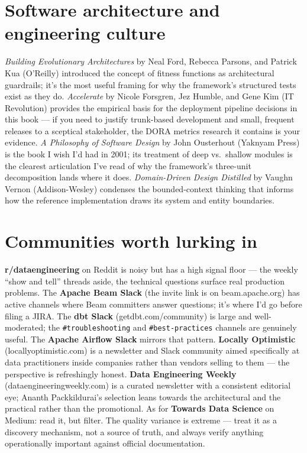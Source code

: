 \documentclass[
  11pt,
  british,
  oneside]{book}
\begin{document}
\hypertarget{software-architecture-and-engineering-culture}{%
\section{Software architecture and engineering
culture}\label{software-architecture-and-engineering-culture}}

\emph{Building Evolutionary Architectures} by Neal Ford, Rebecca
Parsons, and Patrick Kua (O'Reilly) introduced the concept of fitness
functions as architectural guardrails; it's the most useful framing for
why the framework's structured tests exist as they do. \emph{Accelerate}
by Nicole Forsgren, Jez Humble, and Gene Kim (IT Revolution) provides
the empirical basis for the deployment pipeline decisions in this book
--- if you need to justify trunk-based development and small, frequent
releases to a sceptical stakeholder, the DORA metrics research it
contains is your evidence. \emph{A Philosophy of Software Design} by
John Ousterhout (Yaknyam Press) is the book I wish I'd had in 2001; its
treatment of deep vs.~shallow modules is the clearest articulation I've
read of why the framework's three-unit decomposition lands where it
does. \emph{Domain-Driven Design Distilled} by Vaughn Vernon
(Addison-Wesley) condenses the bounded-context thinking that informs how
the reference implementation draws its system and entity boundaries.

\hypertarget{communities-worth-lurking-in}{%
\section{Communities worth lurking
in}\label{communities-worth-lurking-in}}

\textbf{r/dataengineering} on Reddit is noisy but has a high signal
floor --- the weekly ``show and tell'' threads aside, the technical
questions surface real production problems. The \textbf{Apache Beam
Slack} (the invite link is on beam.apache.org) has active channels where
Beam committers answer questions; it's where I'd go before filing a
JIRA. The \textbf{dbt Slack} (getdbt.com/community) is large and
well-moderated; the \texttt{\#troubleshooting} and
\texttt{\#best-practices} channels are genuinely useful. The
\textbf{Apache Airflow Slack} mirrors that pattern. \textbf{Locally
Optimistic} (locallyoptimistic.com) is a newsletter and Slack community
aimed specifically at data practitioners inside companies rather than
vendors selling to them --- the perspective is refreshingly honest.
\textbf{Data Engineering Weekly} (dataengineeringweekly.com) is a
curated newsletter with a consistent editorial eye; Ananth
Packkildurai's selection leans towards the architectural and the
practical rather than the promotional. As for \textbf{Towards Data
Science} on Medium: read it, but filter. The quality variance is extreme
--- treat it as a discovery mechanism, not a source of truth, and always
verify anything operationally important against official documentation.
\end{document}
